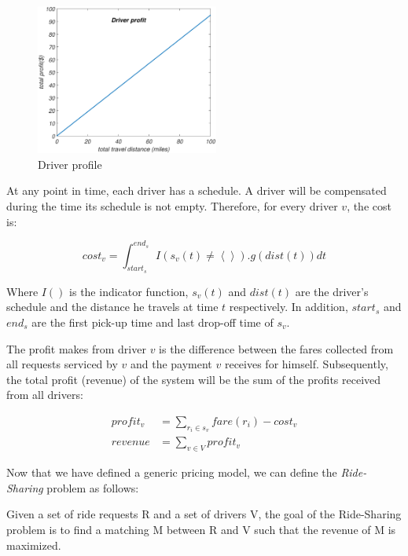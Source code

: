\begin{figure}[!ht]
	\centering
	\includegraphics[width = 60mm]{fig/driver.eps}
	\vspace{-0mm}\caption{Driver profile} \vspace{-2mm} \label{fig:driver_profile}
\end{figure}\vspace{-0mm}
 
At any point in time, each driver has a schedule. A driver will be compensated during the time its schedule is not empty. Therefore, for every driver $v$, the cost is:

\begin{equation}
\label{eq:payment}
cost_v = \int_{start_s}^{end_s} I\left( s_v(t) \neq \left\langle \right\rangle\right).g(dist(t))dt
\end{equation}

\noindent Where $I()$ is the indicator function, $s_v(t)$ and $dist(t)$ are the driver's schedule and the distance he travels at time $t$ respectively. In addition, $start_s$ and $end_s$ are the first pick-up time and last drop-off time of $s_v$.

The profit \fname makes from driver $v$ is the difference between the fares collected from all requests serviced by $v$ and the payment $v$ receives for himself. Subsequently, the total profit (revenue) of the system will be the sum of the profits received from all drivers:

\begin{align}
\label{eq:profit} 
profit_v &= \sum_{r_i \in s_v}fare(r_i) - cost_v\\
revenue &= \sum_{v \in V}profit_v
\end{align}

Now that we have defined a generic pricing model, we can define the \textit{Ride-Sharing} problem as follows:

\begin{definition} 
Given a set of ride requests R and a set of drivers V, the goal of the Ride-Sharing problem is to find a matching M between R and V such that the revenue of M is maximized.
\end{definition}

